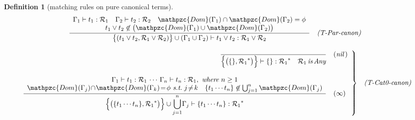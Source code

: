 \documentclass[12pt]{article}
\newtheorem{Definition}{Definition}[section]
\begin{document}
\begin{Definition}[matching rules on pure canonical terms]
\begin{displaymath}
\begin{array}{c}
\begin{array}{rl}
        \dfrac{
          \begin{array}{c}
            \Gamma_1 \vdash t_1 : \mathcal{R}_1
             \quad \Gamma_2 \vdash t_2 : \mathcal{R}_2
              \quad \mathpzc{Dom}(\Gamma_1) \cap \mathpzc{Dom}(\Gamma_2)
               = \phi  \\
            t_1 \vee t_2 \not\in \bigl(\mathpzc{Dom}(\Gamma_1) \cup
             \mathpzc{Dom}(\Gamma_2) \bigr)
          \end{array}
        }{
          \bigl\{(t_1 \vee t_2, \mathcal{R}_1 \vee \mathcal{R}_2) \bigr\}
           \cup (\Gamma_1 \cup \Gamma_2) \vdash
            t_1 \vee t_2 : \mathcal{R}_1 \vee \mathcal{R}_2
        }  &  \text{\it (T-Par-canon)}
      \end{array}  \\
      \\
      
      \begin{array}{rl}
        \left. \begin{array}{rl}
          \dfrac{
          }{
            \Bigl\{\bigl(\{\}, {\mathcal{R}_1}^* \bigr) \Bigr\} \vdash
             \{\}: {\mathcal{R}_1}^*
              \quad \mathcal{R}_1\,\text{\it is}\, \text{\it Any}
          }  &  (\text{\it nil}\,)  \\
          \\
          \dfrac{
            \begin{array}{c}
              \Gamma_1 \vdash t_1 : \mathcal{R}_1 \,\cdots\,
               \Gamma_n \vdash t_n : \mathcal{R}_1,\
                \text{\it where}\ n \ge 1  \\
              \mathpzc{Dom}(\Gamma_j) \!\cap\! \mathpzc{Dom}(\Gamma_k) \!=\!
               \phi \ \text{\it s.t.}\; j \!\neq\! k
              \quad \{t_1 \cdots t_n \} \not\in
               \bigcup_{j=1}^{n}\mathpzc{Dom}(\Gamma_j)
            \end{array}
          }{
            \Bigl\{\bigl(\{t_1 \cdots t_n \}, {\mathcal{R}_1}^* \bigr)
             \Bigr\} \cup {\displaystyle \bigcup_{j = 1}^{n}} \Gamma_j
              \vdash \{t_1 \cdots t_n \} : {\mathcal{R}_1}^*
          }  &  (\infty)
        \end{array} \right\}  &  \text{\it (T-Cat0-canon)}
      \end{array}  \\
      \\
      

\end{array}
\end{displaymath}
\end{Definition}
\end{document}
